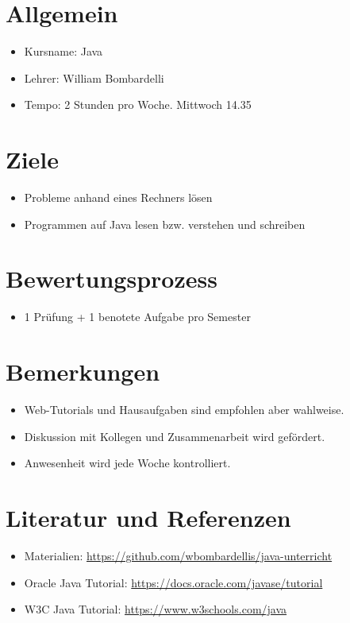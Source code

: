 \documentclass[a4paper]{article}
\begin{document}
	
	
	\section{Allgemein}
	\begin{itemize}
		\item Kursname: Java
		\item Lehrer: William Bombardelli
		\item Tempo: 2 Stunden pro Woche. Mittwoch 14.35
	\end{itemize}
	
	\section{Ziele}
	\begin{itemize}
		\item Probleme anhand eines Rechners lösen
		\item Programmen auf Java lesen bzw. verstehen und schreiben 
	\end{itemize}

	\section{Bewertungsprozess}
	\begin{itemize}
		\item 1 Prüfung + 1 benotete Aufgabe pro Semester
	\end{itemize}

	\section{Bemerkungen}
	\begin{itemize}
		\item Web-Tutorials und Hausaufgaben sind empfohlen aber wahlweise.
		\item Diskussion mit Kollegen und Zusammenarbeit wird gefördert.
		\item Anwesenheit wird jede Woche kontrolliert.
	\end{itemize}

	\section{Literatur und Referenzen}
	\begin{itemize}
		\item Materialien: \url{https://github.com/wbombardellis/java-unterricht}
		\item Oracle Java Tutorial: \url{https://docs.oracle.com/javase/tutorial}
		\item W3C Java Tutorial: \url{https://www.w3schools.com/java}
	\end{itemize}
\end{document}
